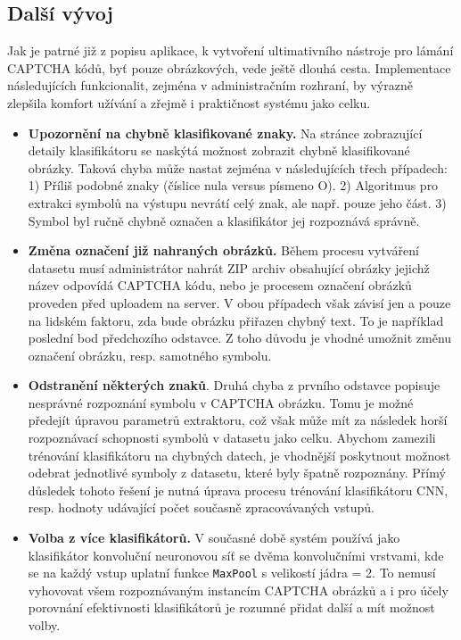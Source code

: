 \documentclass[
  field=ainfp,
  master=true,
  biblatex,
  sourcecodes=false,
  theorems=false,
  glossaries,
  index
]{kidiplom}
\begin{document}
\subsection*{Další vývoj}
Jak je patrné již z popisu aplikace, k vytvoření ultimativního nástroje pro lámání CAPTCHA kódů, byť pouze obrázkových, vede ještě dlouhá cesta. Implementace následujících funkcionalit, zejména v administračním rozhraní, by výrazně zlepšila komfort užívání a zřejmě i praktičnost systému jako celku.

\begin{itemize}
\item \textbf{Upozornění na chybně klasifikované znaky.} Na stránce zobrazující detaily klasifikátoru se naskýtá možnost zobrazit chybně klasifikované obrázky. Taková chyba může nastat zejména v následujících třech případech: 1) Příliš podobné znaky (číslice nula versus písmeno O). 2) Algoritmus pro extrakci symbolů na výstupu nevrátí celý znak, ale např. pouze jeho část. 3) Symbol byl ručně chybně označen a klasifikátor jej rozpoznává správně.
\item \textbf{Změna označení již nahraných obrázků.} Během procesu vytváření datasetu musí administrátor nahrát ZIP archiv obsahující obrázky jejichž název odpovídá CAPTCHA kódu, nebo je procesem označení obrázků proveden před uploadem na server. V obou případech však závisí jen a pouze na lidském faktoru, zda bude obrázku přiřazen chybný text. To je například poslední bod předchozího odstavce. Z toho důvodu je vhodné umožnit změnu označení obrázku, resp. samotného symbolu.
\item \textbf{Odstranění některých znaků}. Druhá chyba z prvního odstavce popisuje nesprávné rozpoznání symbolu v CAPTCHA obrázku. Tomu je možné předejít úpravou parametrů extraktoru, což však může mít za následek horší rozpoznávací schopnosti symbolů v datasetu jako celku. Abychom zamezili trénování klasifikátoru na chybných datech, je vhodnější poskytnout možnost odebrat jednotlivé symboly z datasetu, které byly špatně rozpoznány. Přímý důsledek tohoto řešení je nutná úprava procesu trénování klasifikátoru CNN, resp. hodnoty udávající počet současně zpracovávaných vstupů.
\item  \textbf{Volba z více klasifikátorů.} V současné době systém používá jako klasifikátor konvoluční neuronovou síť se dvěma konvolučními vrstvami, kde se na každý vstup uplatní funkce \texttt{MaxPool} s velikostí jádra = 2. To nemusí vyhovovat všem rozpoznávaným instancím CAPTCHA obrázků a i pro účely porovnání efektivnosti klasifikátorů je rozumné přidat další a mít možnost volby. 

\end{itemize}
\end{document}
